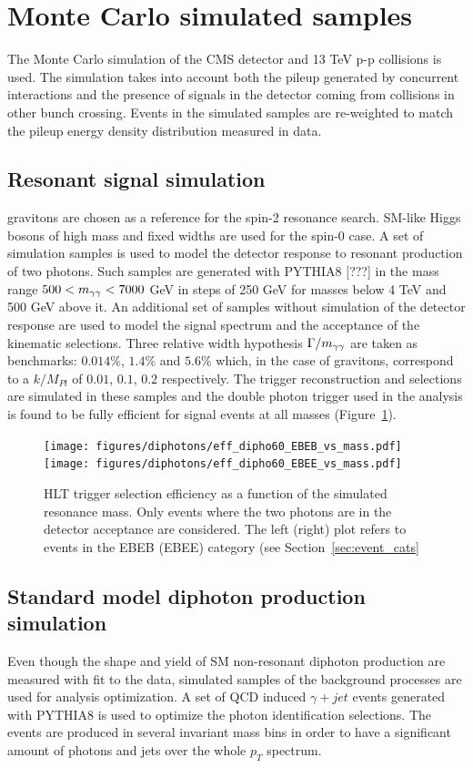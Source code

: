 \clearpage
\section{Monte Carlo simulated samples}
The Monte Carlo simulation of the CMS detector and 13 TeV p-p collisions is used. The simulation
takes into account both the pileup generated by concurrent interactions and the presence of
signals in the detector coming from collisions in other bunch crossing. Events in the simulated samples
are re-weighted to match the pileup energy density distribution measured in data.

\subsection{Resonant signal simulation}
\RS gravitons are chosen as a reference for the spin-2 resonance search. SM-like Higgs bosons of high mass and
fixed widths are used for the spin-0 case.
A set of simulation samples is used to model the detector response to resonant production of two photons.
Such samples are generated with PYTHIA8 [???] in the mass range $500 < m_{\gamma\gamma} < 7000$ GeV in steps of 250 GeV for
masses below 4 TeV and 500 GeV above it. An additional set of samples without simulation of the detector
response are used to model the signal spectrum and the acceptance of the kinematic selections.
Three relative width hypothesis $\Gamma/m_{\gamma\gamma}$ are taken as benchmarks: $0.014\%$, $1.4\%$ and $5.6\%$ which,
in the case of \RS gravitons, correspond to a $k/M_{Pl}$ of $0.01$, $0.1$, $0.2$ respectively.
The trigger reconstruction and selections are simulated in these samples and the double photon trigger
used in the analysis is found to be fully efficient for signal events at all masses (Figure~\ref{fig:trig_eff_sig}).

\begin{figure}[h!]
  \centering
  \texttt{[image: figures/diphotons/eff\_dipho60\_EBEB\_vs\_mass.pdf]}
  \texttt{[image: figures/diphotons/eff\_dipho60\_EBEE\_vs\_mass.pdf]}
  \caption{HLT trigger selection efficiency as a function of the simulated resonance mass. Only events where the two photons are
    in the detector acceptance are considered. The left (right) plot refers to events in the EBEB (EBEE)
    category (see Section~\ref{sec:event_cats}}
  \label{fig:trig_eff_sig}
\end{figure}

\subsection{Standard model diphoton production simulation}
Even though the shape and yield of SM non-resonant diphoton production are measured with fit to the data,
simulated samples of the background processes are used for analysis optimization. A set of QCD induced
$\gamma+jet$ events generated with PYTHIA8 is used to optimize the photon identification selections.
The events are produced in several invariant mass bins in order to have a significant amount of photons and
jets over the whole $p_T$ spectrum.


